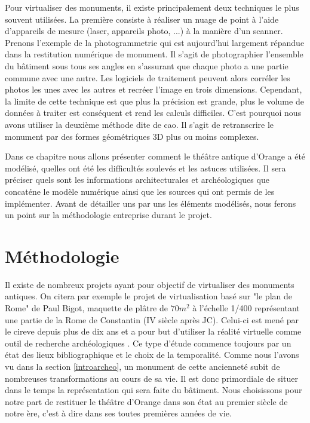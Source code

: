 Pour virtualiser des monuments, il existe principalement deux techniques le plus souvent utilisées. La première consiste à réaliser un nuage de point à l'aide d'appareils de mesure (laser, appareils photo, ...) à la manière d'un scanner. Prenons l'exemple de la photogrammetrie qui est aujourd'hui largement répandue dans la restitution numérique de monument. Il s'agit de photographier l'ensemble du bâtiment sous tous ses angles en s'assurant que chaque photo a une partie commune avec une autre. Les logiciels de traitement peuvent alors corréler les photos les unes avec les autres et recréer l'image en trois dimensions. Cependant, la limite de cette technique est que plus la précision est grande, plus le volume de données à traiter est conséquent et rend les calculs difficiles. C'est pourquoi nous avons utiliser la deuxième méthode dite de \gls{cao}. Il s'agit de retranscrire le monument par des formes géométriques 3D plus ou moins complexes.

Dans ce chapitre nous allons présenter comment le théâtre antique d'Orange a été modélisé, quelles ont été les difficultés soulevés et les astuces utilisées. Il sera préciser quels sont les informations architecturales et archéologiques que concaténe le modèle numérique ainsi que les sources qui ont permis de les implémenter.
Avant de détailler uns par uns les éléments modélisés, nous ferons un point sur la méthodologie entreprise durant le projet.


\section{Méthodologie}

Il existe de nombreux projets ayant pour objectif de virtualiser des monuments antiques. On citera par exemple le projet de virtualisation basé sur "le plan de Rome" de Paul Bigot, maquette de plâtre de $70m^2$ à l'échelle 1/400 représentant une partie de la Rome de Constantin (IV siècle après JC). Celui-ci est mené par le \gls{cireve} depuis plus de dix ans et a pour but d'utiliser la réalité virtuelle comme outil de recherche archéologiques \cite{fleury}. Ce type d'étude commence toujours par un état des lieux bibliographique et le choix de la temporalité. Comme nous l'avons vu dans la section \ref{introarcheo}, un monument de cette ancienneté subit de nombreuses transformations au cours de sa vie. Il est donc primordiale de situer dans le temps la représentation qui sera faite du bâtiment. Nous choisissons pour notre part de restituer le théâtre d'Orange dans son état au premier siècle de notre ère, c'est à dire dans ses toutes premières années de vie.


